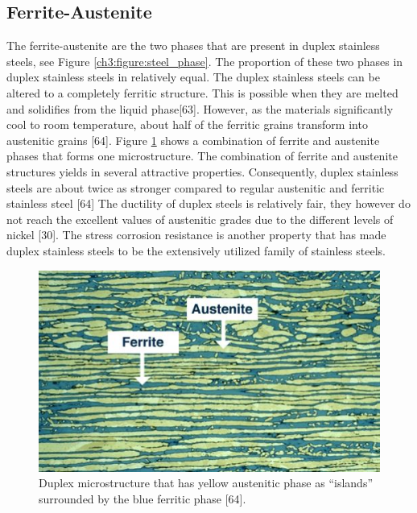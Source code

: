 \documentclass[12pt]{report}
\begin{document}
\subsection{Ferrite-Austenite}
The ferrite-austenite are the two phases that are present in duplex stainless steels, see Figure \ref{ch3:figure:steel_phase}. The proportion of these two phases in duplex stainless steels in relatively equal. The duplex stainless steels can be altered to a completely ferritic structure. This is possible when they are melted and solidifies from the liquid phase[63].  However, as the materials significantly cool to room temperature, about half of the ferritic grains transform into austenitic grains [64]. Figure \ref{ch3:figure:duplex_microstructure} shows a combination of ferrite and austenite phases that forms one microstructure.
The combination of ferrite and austenite structures yields in several attractive properties. Consequently, duplex stainless steels are about twice as stronger compared to regular austenitic and ferritic stainless steel [64] The ductility of duplex steels is relatively fair, they however do not reach the excellent values of austenitic grades due to the different levels of nickel [30]. The stress corrosion resistance is another property that has made duplex stainless steels to be the extensively utilized family of stainless steels. 

\begin{figure}[H]
    \centering
    \includegraphics[width=.6\textwidth]{duplex_microstructure_that_has_yellow_austenitic_phase.jpg}
    \caption{Duplex microstructure that has yellow austenitic phase as “islands” surrounded by the blue ferritic phase [64].}
    \label{ch3:figure:duplex_microstructure}
\end{figure}
\end{document}
